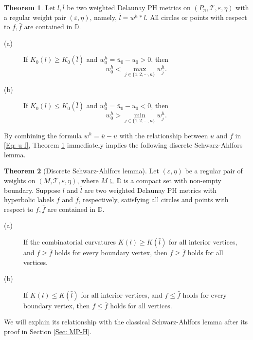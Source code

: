 \documentclass[12pt]{amsart}
\theoremstyle{definition}
\newtheorem{theorem}{Theorem}[section]
\newtheorem{remark}[theorem]{Remark}
\begin{document}
\begin{theorem}\label{Thm: MP-H}
Let $l,\bar{l}$ be two weighted Delaunay PH metrics on $(P_n,\mathcal{T},\varepsilon,\eta)$ with a regular weight pair $(\varepsilon,\eta)$, namely, $\bar{l}=w^h*l$.
All circles or points with respect to $f,\bar f$ are contained in $\mathbb{D}$.
\begin{description}
  \item[(a)] If $K_0(l)\geq K_0(\bar{l})$ and $w^h_0=\bar{u}_0-u_0>0$, then
\begin{equation*}
w^h_0<\max_{j\in \{1, 2, \cdots, n\}}w^h_j.
\end{equation*}
  \item[(b)] If $K_0(l)\leq K_0(\bar{l})$ and $w_0^h=\bar{u}_0-u_0<0$, then
\begin{equation*}
w^h_0>\min_{j\in \{1, 2, \cdots, n\}}w^h_j.
\end{equation*}
\end{description}
\end{theorem}


By combining the formula $w^h = \bar{u} - u$ with the relationship between $u$ and $f$ in \eqref{Eq: u f}, Theorem \ref{Thm: MP-H} immediately implies the following discrete Schwarz-Ahlfors lemma. 
\begin{theorem}[Discrete Schwarz-Ahlfors lemma]\label{Thm: DSL2}
Let $(\varepsilon,\eta)$ be a regular pair of weights on $(M,\mathcal{T},\varepsilon,\eta)$, where $M\subseteq\mathbb{D}$ is a compact set with non-empty boundary.
Suppose $l$ and $\bar{l}$ are two weighted Delaunay PH metrics with hyperbolic labels $f$ and $\bar{f}$, respectively, satisfying all circles and points with respect to $f,\bar f$ are contained in $\mathbb{D}$.
\begin{description}
\item[(a)] If the combinatorial curvatures $K(l)\geq K(\bar{l})$ for all interior vertices, and $f \geq \bar{f}$ holds for every boundary vertex, then $f \geq \bar{f}$ holds for all vertices.
\item[(b)] If $K(l)\leq K(\bar{l})$ for all interior vertices, and $f \leq \bar{f}$ holds for every boundary vertex, then $f \leq \bar{f}$ holds for all vertices.
\end{description}
\end{theorem}
We will explain its relationship with the classical Schwarz-Ahlfors lemma after its proof in Section \ref{Sec: MP-H}. 



\end{document}
